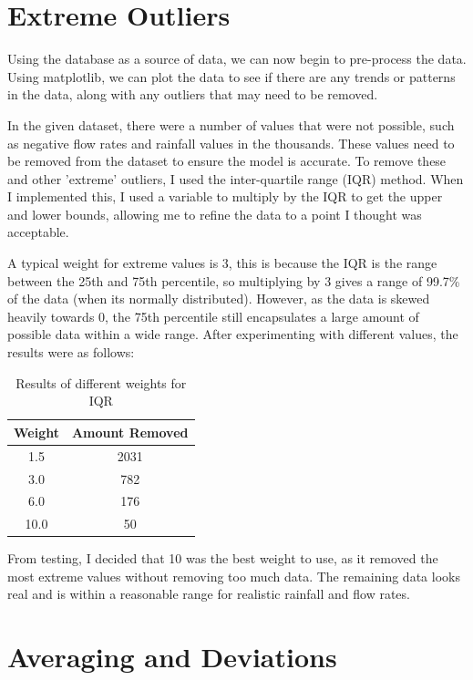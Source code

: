 \documentclass{report}
\begin{document}
\section{Extreme Outliers}
Using the database as a source of data, we can now begin to pre-process the data.
Using matplotlib, we can plot the data to see if there are any trends or patterns in the data,
along with any outliers that may need to be removed.

\vspace{1em}
In the given dataset, there were a number of values that were not possible, such as negative flow rates and rainfall values in the thousands.
These values need to be removed from the dataset to ensure the model is accurate.
To remove these and other 'extreme' outliers, I used the inter-quartile range (IQR) method.
When I implemented this, I used a variable to multiply by the IQR to get the upper and lower bounds, allowing me to refine the data to a point I thought was acceptable.

\vspace{1em}
A typical weight for extreme values is 3, this is because the IQR is the range between the 25th and 75th percentile, so multiplying by 3 gives a range of 99.7\% of the data (when its normally distributed).
However, as the data is skewed heavily towards 0, the 75th percentile still encapsulates a large amount of possible data within a wide range.
After experimenting with different values, the results were as follows:

\begin{table}[h]
    \centering
    \begin{tabular}{|c|c|}
        \hline
        Weight & Amount Removed \\
        \hline
        1.5 & 2031 \\
        3.0 & 782 \\
        6.0 & 176 \\
        10.0 & 50 \\
        \hline
    \end{tabular}
    \caption{Results of different weights for IQR}
    \label{tab:iqr_results}
\end{table}

From testing, I decided that 10 was the best weight to use, as it removed the most extreme values without removing too much data.
The remaining data looks real and is within a reasonable range for realistic rainfall and flow rates.

\section{Averaging and Deviations}
\end{document}
